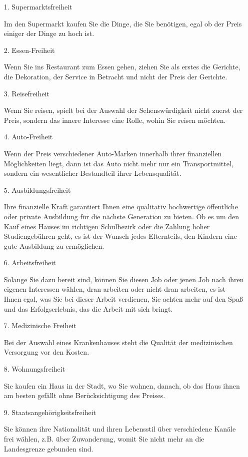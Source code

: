 \documentclass[11pt,a4paper]{article}
\begin{document}
\begin{itemize}
\item[1.] Supermarktsfreiheit

Im den Supermarkt kaufen Sie die Dinge, die Sie benötigen, egal ob der Preis
einiger der Dinge zu hoch ist.

\item[2.] Essen-Freiheit

Wenn Sie ins Restaurant zum Essen gehen, ziehen Sie als erstes die Gerichte,
die Dekoration, der Service in Betracht und nicht der Preis der Gerichte.

\item[3.] Reisefreiheit

Wenn Sie reisen, spielt bei der Auswahl der Sehenswürdigkeit nicht zuerst der
Preis, sondern das innere Interesse eine Rolle, wohin Sie reisen möchten.

\item[4.] Auto-Freiheit

Wenn der Preis verschiedener Auto-Marken innerhalb ihrer finanziellen
Möglichkeiten liegt, dann ist das Auto nicht mehr nur ein Transportmittel,
sondern ein wesentlicher Bestandteil ihrer Lebensqualität.

\item[5.] Ausbildungsfreiheit

Ihre finanzielle Kraft garantiert Ihnen eine qualitativ hochwertige
öffentliche oder private Ausbildung für die nächste Generation zu bieten. Ob
es um den Kauf eines Hauses im richtigen Schulbezirk oder die Zahlung hoher
Studiengebühren geht, es ist der Wunsch jedes Elternteils, den Kindern eine
gute Ausbildung zu ermöglichen.

\item[6.] Arbeitsfreiheit

Solange Sie dazu bereit sind, können Sie diesen Job oder jenen Job nach ihren
eigenen Interessen wählen, dran arbeiten oder nicht dran arbeiten, es ist
Ihnen egal, was Sie bei dieser Arbeit verdienen, Sie achten mehr auf den Spaß
und das Erfolgserlebnis, das die Arbeit mit sich bringt.

\item[7.] Medizinische Freiheit

Bei der Auswahl eines Krankenhauses steht die Qualität der medizinischen
Versorgung vor den Kosten.

\item[8.] Wohnungsfreiheit

Sie kaufen ein Haus in der Stadt, wo Sie wohnen, danach, ob das Haus ihnen am
besten gefällt ohne Berücksichtigung des Preises.

\item[9.] Staatsangehörigkeitsfreiheit

Sie können ihre Nationalität und ihren Lebensstil über verschiedene Kanäle
frei wählen, z.B. über Zuwanderung, womit Sie nicht mehr an die Landesgrenze
gebunden sind.
\end{itemize}
\end{document}
